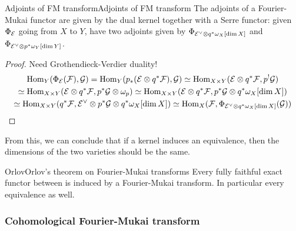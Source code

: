 \begin{proposition}{Adjoints of FM transform}{Adjoints of FM transform}
    The adjoints of a Fourier-Mukai functor are given by the dual kernel together with a Serre functor: given $\Phi_{\mathcal{E}}$ going from $X$ to $Y$, have two adjoints given by $\Phi_{\mathcal{E}^\vee\otimes q^*\omega_{X}[\dim X]}$ and $\Phi_{\mathcal{E}^\vee\otimes p^* \omega_{Y}[\dim Y]}$.
\end{proposition}
\begin{proof}
 Need Grothendieck-Verdier duality!
\begin{gather*}
    \operatorname{Hom}_Y(\Phi_{\mathcal{E}}(\mathcal{F}),\mathcal{G})
        = \operatorname{Hom}_Y(p_*(\mathcal{E}\otimes q^*\mathcal{F}),\mathcal{G})
        \simeq \operatorname{Hom}_{X\times Y}(\mathcal{E}\otimes q^*\mathcal{F},p^!\mathcal{G}) \\
        \simeq \operatorname{Hom}_{X\times Y}(\mathcal{E}\otimes q^*\mathcal{F},p^*\mathcal{G}\otimes\omega_p)
        \simeq \operatorname{Hom}_{X\times Y}(\mathcal{E}\otimes q^*\mathcal{F},p^*\mathcal{G}\otimes q^*\omega_X[\dim X]) \\
        \simeq \operatorname{Hom}_{X\times Y}(q^*\mathcal{F},\mathcal{E}^\vee\otimes p^*\mathcal{G}\otimes q^* \omega_X[\dim X])
        \simeq \operatorname{Hom}_X(\mathcal{F},\Phi_{\mathcal{E}^\vee\otimes q^*\omega_X[\dim X]}(\mathcal{G}))
\end{gather*}
\end{proof}
From this, we can conclude that if a kernel induces an equivalence, then the dimensions of the two varieties should be the same.

\begin{theorem}{Orlov}{Orlov's theorem on Fourier-Mukai transforms}
    Every fully faithful exact functor between is induced by a Fourier-Mukai transform. In particular every equivalence as well.
\end{theorem}



\subsubsection{Cohomological Fourier-Mukai transform}






